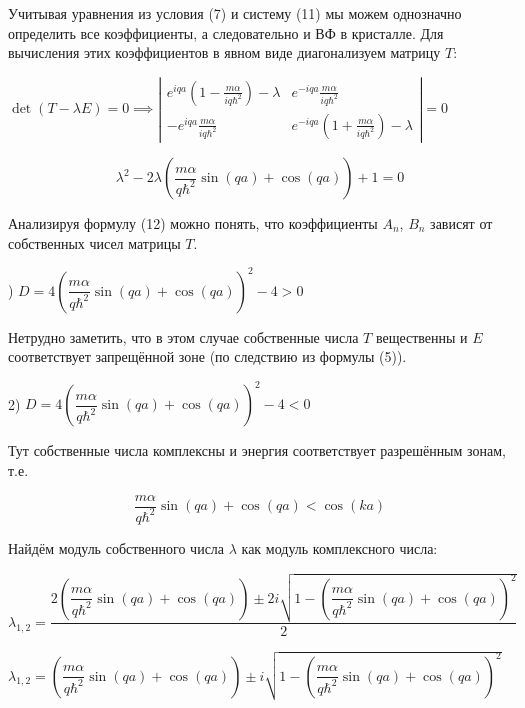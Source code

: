 \documentclass[a4paper, 12pt]{article}
\begin{document}
	\quad Учитывая уравнения из условия (7) и систему (11) мы можем однозначно определить все коэффициенты, а следовательно и ВФ в кристалле. Для вычисления этих коэффициентов в явном виде диагонализуем матрицу $T$: 
	
	\begin{center}
		$\det (T - \lambda E ) = 0 \implies \left|\begin{array}{cc}
			e^{iqa} \left(1 - \frac{m\alpha}{iq\hbar^2}\right) - \lambda& e^{-iqa} \frac{m\alpha}{iq\hbar^2} \\
			-e^{iqa} \frac{m\alpha}{iq\hbar^2} & e^{-iqa} \left(1+ \frac{m\alpha}{iq\hbar^2}\right) -\lambda
		\end{array}\right| = 0$
	\end{center} 
	
	\begin{equation}
		\lambda^2 - 2\lambda\left(\dfrac{m\alpha}{q\hbar^2} \sin(qa) + \cos(qa) \right) + 1 = 0
	\end{equation}
	
	\quad Анализируя формулу (12) можно понять, что коэффициенты $A_n$, $B_n$ зависят от собственных чисел матрицы $T$. 
	
	) $D = 4\left(\dfrac{m\alpha}{q\hbar^2} \sin(qa) + \cos(qa) \right)^2 - 4 > 0 $
	
	\quad Нетрудно заметить, что в этом случае собственные числа $T$ вещественны и $E$ соответствует запрещённой зоне (по следствию из формулы (5)). 
	
	2) $D = 4\left(\dfrac{m\alpha}{q\hbar^2} \sin(qa) + \cos(qa) \right)^2 - 4 < 0$
	
	\quad Тут собственные числа комплексны и энергия соответствует разрешённым зонам, т.е. 
	
	\begin{equation}
		\dfrac{m\alpha}{q\hbar^2} \sin(qa) + \cos(qa)  < \cos(ka)
	\end{equation}
	
	\quad Найдём модуль собственного числа $\lambda$ как модуль комплексного числа: 
	
	\begin{center}
		$\lambda_{1, 2} = \dfrac{2\left(\dfrac{m\alpha}{q\hbar^2} \sin(qa) + \cos(qa)\right) \pm 2i \sqrt{1 -\left(\dfrac{m\alpha}{q\hbar^2} \sin(qa) + \cos(qa)\right)^2 }}{2}$
		
		$\lambda_{1,2} = \left(\dfrac{m\alpha}{q\hbar^2} \sin(qa) + \cos(qa)\right) \pm i \sqrt{1 - \left(\dfrac{m\alpha}{q\hbar^2} \sin(qa) + \cos(qa)\right)^2}$
	\end{center}
	
\end{document}
